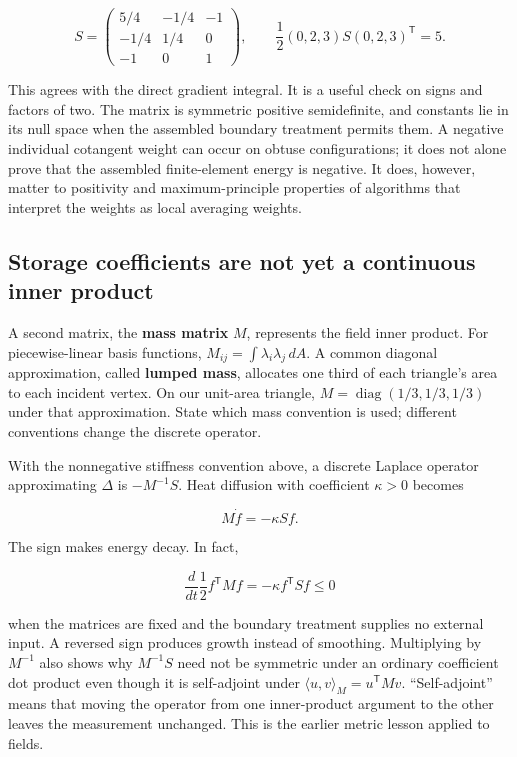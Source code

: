 \[
S=\begin{pmatrix}5/4&-1/4&-1\\-1/4&1/4&0\\-1&0&1\end{pmatrix},
\qquad \frac12(0,2,3)S(0,2,3)^{\mathsf T}=5.
\]

This agrees with the direct gradient integral. It is a useful check on signs and factors of two. The matrix is symmetric positive semidefinite, and constants lie in its null space when the assembled boundary treatment permits them. A negative individual cotangent weight can occur on obtuse configurations; it does not alone prove that the assembled finite-element energy is negative. It does, however, matter to positivity and maximum-principle properties of algorithms that interpret the weights as local averaging weights.

\subsection{Storage coefficients are not yet a continuous inner product}\label{02-foundations-ii-ch021-storage-coefficients-are-not-yet-a-continuous-inner-product}

\hypertarget{02-foundations-ii-ch021-storage-coefficients-are-not-yet-a-continuous-inner-product}{}

A second matrix, the \textbf{mass matrix} \(M\), represents the field inner product. For piecewise-linear basis functions, \(M_{ij}=\int\lambda_i\lambda_j\,dA\). A common diagonal approximation, called \textbf{lumped mass}, allocates one third of each triangle's area to each incident vertex. On our unit-area triangle, \(M=\operatorname{diag}(1/3,1/3,1/3)\) under that approximation. State which mass convention is used; different conventions change the discrete operator.

With the nonnegative stiffness convention above, a discrete Laplace operator approximating \(\Delta\) is \(-M^{-1}S\). Heat diffusion with coefficient \(\kappa>0\) becomes

\[
M\dot f=-\kappa Sf.
\]

The sign makes energy decay. In fact,

\[
\frac{d}{dt}\frac12 f^{\mathsf T}Mf
=-\kappa f^{\mathsf T}Sf\le0
\]

when the matrices are fixed and the boundary treatment supplies no external input. A reversed sign produces growth instead of smoothing. Multiplying by \(M^{-1}\) also shows why \(M^{-1}S\) need not be symmetric under an ordinary coefficient dot product even though it is self-adjoint under \(\langle u,v\rangle_M=u^{\mathsf T}Mv\). ``Self-adjoint'' means that moving the operator from one inner-product argument to the other leaves the measurement unchanged. This is the earlier metric lesson applied to fields.

